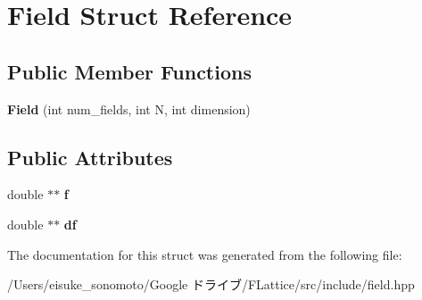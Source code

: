 \hypertarget{struct_field}{}\section{Field Struct Reference}
\label{struct_field}
\subsection*{Public Member Functions}
\begin{DoxyCompactItemize}
\item 
\mbox{\label{struct_field_a62e149e131ff69192875e9060bd7bcb4}} 
{\bfseries Field} (int num\+\_\+fields, int N, int dimension)
\end{DoxyCompactItemize}
\subsection*{Public Attributes}
\begin{DoxyCompactItemize}
\item 
\mbox{\label{struct_field_a8bbb1525a0541230ec3376bc3a44e589}} 
double $\ast$$\ast$ {\bfseries f}
\item 
\mbox{\label{struct_field_a1102bc9b742e304096ab321cf97844d8}} 
double $\ast$$\ast$ {\bfseries df}
\end{DoxyCompactItemize}


The documentation for this struct was generated from the following file\+:\begin{DoxyCompactItemize}
\item 
/\+Users/eisuke\+\_\+sonomoto/\+Google ドライブ/\+F\+Lattice/src/include/field.\+hpp\end{DoxyCompactItemize}
